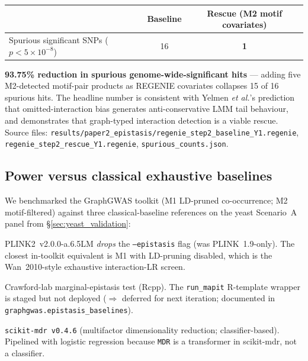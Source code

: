 \begin{center}\small
\begin{tabular}{lcc}
\toprule
                                            & Baseline & Rescue (M2 motif covariates) \\
\midrule
Spurious significant SNPs ($p<5\times10^{-8}$) & 16       & \textbf{1} \\
\bottomrule
\end{tabular}
\end{center}

\textbf{93.75\% reduction in spurious genome-wide-significant hits} —
adding five M2-detected motif-pair products as REGENIE covariates
collapses 15 of 16 spurious hits.  The headline number is consistent
with Yelmen \emph{et al.}'s prediction that omitted-interaction bias
generates anti-conservative LMM tail behaviour, and demonstrates that
graph-typed interaction detection is a viable rescue.  Source files:
\texttt{results/paper2\_epistasis/regenie\_step2\_baseline\_Y1.regenie},
\texttt{regenie\_step2\_rescue\_Y1.regenie},
\texttt{spurious\_counts.json}.

\subsection{Power versus classical exhaustive baselines}\label{sec:power_baselines}

We benchmarked the GraphGWAS toolkit (M1 LD-pruned co-occurrence; M2
motif-filtered) against three classical-baseline references on the
yeast Scenario~A panel from §\ref{sec:yeast_validation}:

\begin{description}\setlength{\itemsep}{0pt}
\item[BOOST]  PLINK2~v2.0.0-a.6.5LM \emph{drops} the
  \texttt{--epistasis} flag (was PLINK~1.9-only). The closest in-toolkit
  equivalent is M1 with LD-pruning disabled, which is the
  Wan~2010-style exhaustive interaction-LR screen.
\item[MAPIT]  Crawford-lab marginal-epistasis test (Rcpp). The
  \texttt{run\_mapit} R-template wrapper is staged but not deployed
  ($\Rightarrow$ deferred for next iteration; documented in
  \texttt{graphgwas.epistasis\_baselines}).
\item[MDR]    \texttt{scikit-mdr v0.4.6} (multifactor dimensionality
  reduction; classifier-based). Pipelined with logistic regression
  because \texttt{MDR} is a transformer in scikit-mdr, not a classifier.
\end{description}

